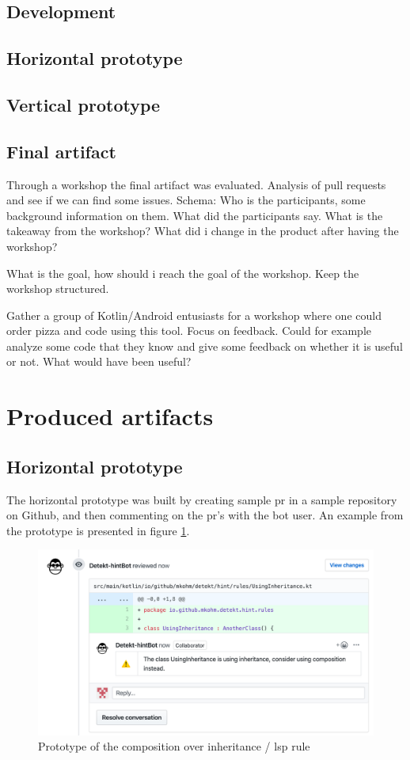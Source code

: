 \documentclass{report}
\begin{document}
\subsection{Development}

\subsection{Horizontal prototype}
\subsection{Vertical prototype}
\subsection{Final artifact}
Through a workshop the final artifact was evaluated. Analysis of pull requests and see if we can find some issues.
Schema:
Who is the participants, some background information on them. What did the participants say. What is the takeaway from the workshop? What did i change in the product after having the workshop?

What is the goal, how should i reach the goal of the workshop. Keep the workshop structured.


Gather a group of Kotlin/Android entusiasts for a workshop where one could order pizza and code using this tool. Focus on feedback. Could for example analyze some code that they know and give some feedback on whether it is useful or not. What would have been useful?

\section{Produced artifacts}

\subsection{Horizontal prototype}
The horizontal prototype was built by creating sample \gls{pr} in a sample repository on Github\cite{sample-repository}, and then commenting on the \gls{pr}'s with the bot user. An example from the prototype is presented in figure \ref{fig:liskov}. 

\begin{figure}[h!]
    \centering
    \includegraphics[width=\textwidth]{../demo.png}
    \caption{Prototype of the composition over inheritance / \gls{lsp} rule}
    \label{fig:liskov}
\end{figure}
\end{document}
